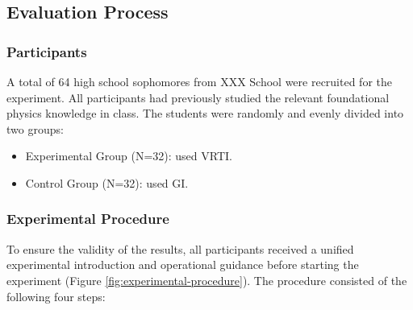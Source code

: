 \documentclass[sigconf,review,anonymous]{acmart}
\begin{document}
\subsection{Evaluation Process}
\subsubsection{Participants}
A total of 64 high school sophomores from XXX
School were recruited for the experiment. All participants had previously studied the relevant foundational physics knowledge in class. The students were randomly and evenly divided into two groups:

\begin{itemize}
  \item Experimental Group (N=32): used VRTI.

  \item Control Group (N=32): used GI.
\end{itemize}

\subsubsection{Experimental Procedure}
To ensure the validity of the results, all participants received a unified experimental introduction and operational guidance before starting the experiment (Figure \ref{fig:experimental-procedure}). The procedure consisted of the following four steps:
\end{document}
